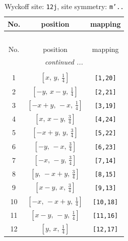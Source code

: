 \documentclass[fleqn,8pt]{jsarticle}
\begin{document}
\begin{longtable}{ccc}
\caption{Wyckoff site: {\tt 12j}, site symmetry: {\tt m'..}}
 \\
 \hline \hline
No. & position & mapping \\ \hline \endfirsthead

\multicolumn{2}{l}{\tablename\ \thetable{}} \\
 \hline \hline
No. & position & mapping \\ \hline \endhead

 \hline \hline
\multicolumn{2}{r}{\footnotesize\it continued ...} \\ \endfoot

 \hline \hline
\multicolumn{2}{r}{} \\ \endlastfoot

1 & $\left[ x,\, y,\, \frac{1}{4} \right]$ & {\tt [1,20]} \\ \hline
2 & $\left[ - y,\, x - y,\, \frac{1}{4} \right]$ & {\tt [2,21]} \\ \hline
3 & $\left[ - x + y,\, - x,\, \frac{1}{4} \right]$ & {\tt [3,19]} \\ \hline
4 & $\left[ x,\, x - y,\, \frac{3}{4} \right]$ & {\tt [4,24]} \\ \hline
5 & $\left[ - x + y,\, y,\, \frac{3}{4} \right]$ & {\tt [5,22]} \\ \hline
6 & $\left[ - y,\, - x,\, \frac{3}{4} \right]$ & {\tt [6,23]} \\ \hline
7 & $\left[ - x,\, - y,\, \frac{3}{4} \right]$ & {\tt [7,14]} \\ \hline
8 & $\left[ y,\, - x + y,\, \frac{3}{4} \right]$ & {\tt [8,15]} \\ \hline
9 & $\left[ x - y,\, x,\, \frac{3}{4} \right]$ & {\tt [9,13]} \\ \hline
10 & $\left[ - x,\, - x + y,\, \frac{1}{4} \right]$ & {\tt [10,18]} \\ \hline
11 & $\left[ x - y,\, - y,\, \frac{1}{4} \right]$ & {\tt [11,16]} \\ \hline
12 & $\left[ y,\, x,\, \frac{1}{4} \right]$ & {\tt [12,17]} \\
\end{longtable}
\renewcommand{\arraystretch}{1.2}
\end{document}
